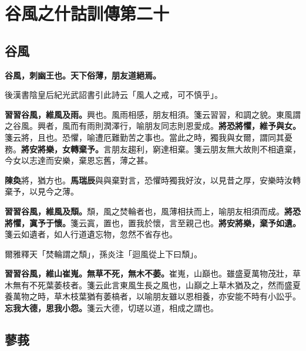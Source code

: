 \chapter{谷風之什詁訓傳第二十}

\section{谷風}


\textbf{谷風，刺幽王也。天下俗薄，朋友道絕焉。}

\begin{quoting}後漢書陰皇后紀光武詔書引此詩云「風人之戒，可不慎乎」。\end{quoting}

\textbf{習習谷風，維風及雨。}{\footnotesize 興也。風雨相感，朋友相須。箋云習習，和調之貌。東風謂之谷風。興者，風而有雨則潤澤行，喻朋友同志則恩愛成。}\textbf{將恐將懼，維予與女。}{\footnotesize 箋云將，且也。恐懼，喻遭厄難勤苦之事也。當此之時，獨我與女爾，謂同其憂務。}\textbf{將安將樂，女轉棄予。}{\footnotesize 言朋友趨利，窮達相棄。箋云朋友無大故則不相遺棄，今女以志達而安樂，棄恩忘舊，薄之甚。}

\begin{quoting}\textbf{陳奐}將，猶方也。\textbf{馬瑞辰}與與棄對言，恐懼時獨我好汝，以見昔之厚，安樂時汝轉棄予，以見今之薄。\end{quoting}

\textbf{習習谷風，維風及頹。}{\footnotesize 頹，風之焚輪者也，風薄相扶而上，喻朋友相須而成。}\textbf{將恐將懼，寘予于懷。}{\footnotesize 箋云寘，置也，置我於懷，言至親己也。}\textbf{將安將樂，棄予如遺。}{\footnotesize 箋云如遺者，如人行道遺忘物，忽然不省存也。}

\begin{quoting}爾雅釋天「焚輪謂之頹」，孫炎注「迴風從上下曰頹」。\end{quoting}

\textbf{習習谷風，維山崔嵬。無草不死，無木不萎。}{\footnotesize 崔嵬，山巔也。雖盛夏萬物茂壯，草木無有不死葉萎枝者。箋云此言東風生長之風也，山巔之上草木猶及之，然而盛夏養萬物之時，草木枝葉猶有萎槁者，以喻朋友雖以恩相養，亦安能不時有小訟乎。}\textbf{忘我大德，思我小怨。}{\footnotesize 箋云大德，切瑳以道，相成之謂也。}

\section{蓼莪}


